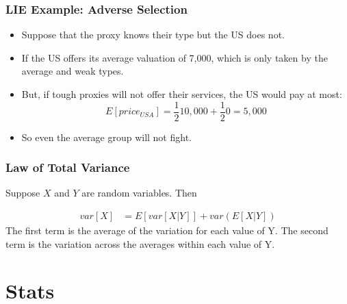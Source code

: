 \documentclass[aspectratio=169, handout]{beamer}
\numberwithin{equation}{section}
\begin{document}
\begin{frame}
\frametitle{LIE Example: Adverse Selection}
\begin{itemize}
\item  Suppose that the proxy knows their type but the US does not.\pause
\item If the US offers its average valuation of 7,000, which is only taken by the average and weak types.\pause
\item But, if tough proxies will not offer their services, the US would pay at most:
$$E[price_{USA}]=\frac{1}{2}10,000+\frac{1}{2}0=5,000$$
\item So even the average group will not fight.
\end{itemize}
\end{frame}

\begin{frame}
\frametitle{Law of Total Variance}
Suppose $X$ and $Y$ are random variables.  Then 

\begin{align*}
var[X] &= E[var[X|Y]]+var(E[X|Y])  
\end{align*}
The first term is the average of the variation for each value of Y.\pause
The second term is the variation across the averages within each value of Y.
\end{frame}

\section{Stats}
\end{document}
